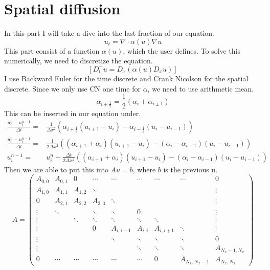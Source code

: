 \documentclass[norsk,11pt,a4paper]{article}
\begin{document}
\section*{Spatial diffusion}
In this part I will take a dive into the last fraction of our equation.
\begin{equation}
	u_t = \nabla \cdot \alpha(u)\nabla u
\end{equation}
This part consist of a function $\alpha(u)$, which the user defines. 
To solve this numerically, we need to discretize the equation.
\begin{equation*}
	\left[D_t^-u=D_x(\alpha(u) D_x u)\right]
\end{equation*}
I use Backward Euler for the time discrete and Crank Nicolson for the spatial
discrete. Since we only use CN one time for $\alpha$, we need to use arithmetic mean.
\begin{equation*}
	\alpha_{i\pm\frac{1}{2}} =\frac{1}{2}(\alpha_i+\alpha_{i\pm1}) 
\end{equation*}
This can be inserted in our equation under.
\begin{align*}
	\frac{u^n_i-u^{n-1}_i}{\Delta t}=& \frac{1}{\Delta x^2}\left(\alpha_{i+\frac{1}{2}}(u_{i+1}-u_i)-\alpha_{i-\frac{1}{2}}(u_{i}-u_{i-1})\right)\\
	\frac{u^n_i-u^{n-1}_i}{\Delta t}=& \frac{1}{2\Delta x^2}\left((\alpha_{i+1}+\alpha_{i})(u_{i+1}-u_i)-(\alpha_{i}-\alpha_{i-1})(u_{i}-u_{i-1})\right)\\
	u^{n-1}_i=&u^n_i- \frac{\Delta t}{2\Delta x^2}\left((\alpha_{i+1}+\alpha_{i})(u_{i+1}-u_i)-(\alpha_{i}-\alpha_{i-1})(u_{i}-u_{i-1})\right)
\end{align*}
Then we are able to put this into $Au = b$, where $b$ is the previous u.
\begin{equation}
A =
\left(
\begin{array}{cccccccccc}
A_{0,0} & A_{0,1} & 0
&\cdots &
\cdots & \cdots & \cdots &
\cdots & 0 \\
A_{1,0} & A_{1,1} & A_{1,2} & \ddots &   & &  & &  \vdots \\
0 & A_{2,1} & A_{2,2} & A_{2,3} &
\ddots & &  &  & \vdots \\
\vdots & \ddots &  & \ddots & \ddots & 0 &  & & \vdots \\
\vdots &  & \ddots & \ddots & \ddots & \ddots & \ddots & & \vdots \\
\vdots & &  & 0 & A_{i,i-1} & A_{i,i} & A_{i,i+1} & \ddots & \vdots \\
\vdots & & &  & \ddots & \ddots & \ddots &\ddots  & 0 \\
\vdots & & & &  &\ddots  & \ddots &\ddots  & A_{N_x-1,N_x} \\
0 &\cdots & \cdots &\cdots & \cdots & \cdots  & 0 & A_{N_x,N_x-1} & A_{N_x,N_x}
\end{array}
\right)
\tag{14}
\end{equation}
\end{document}
